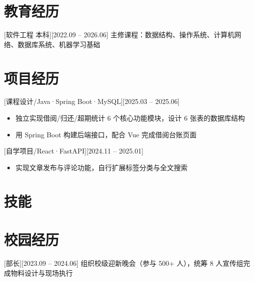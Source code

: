 \documentclass{resume}
\begin{document}
\ResumeTitle

\section{教育经历}
[\textnormal{软件工程\textbar} 本科][2022.09 -- 2026.06]
主修课程：数据结构、操作系统、计算机网络、数据库系统、机器学习基础


\section{项目经历}
[课程设计/Java·Spring Boot·MySQL][2025.03 -- 2025.06]
\begin{itemize}
  \item 独立实现借阅/归还/超期统计 6 个核心功能模块，设计 6 张表的数据库结构
  \item 用 Spring Boot 构建后端接口，配合 Vue 完成借阅台账页面
\end{itemize}

[自学项目/React·FastAPI][2024.11 -- 2025.01]
\begin{itemize}
  \item 实现文章发布与评论功能，自行扩展标签分类与全文搜索
\end{itemize}

\section{技能}

\section{校园经历}
[\textnormal{部长}][2023.09 -- 2024.06]
组织校级迎新晚会（参与 500+ 人），统筹 8 人宣传组完成物料设计与现场执行
\end{document}
